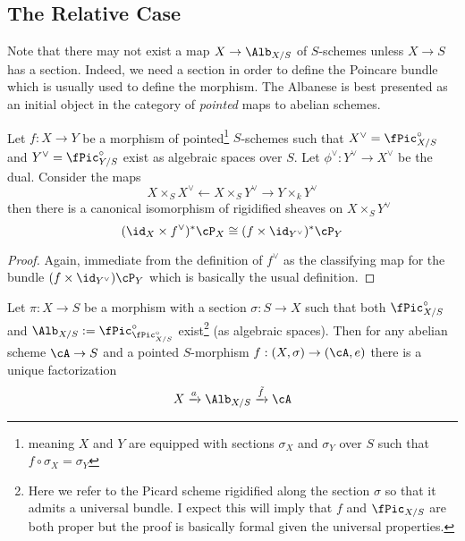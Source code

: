 \documentclass[12pt]{article}
\begin{document}
\subsection{The Relative Case}

\begin{rmk}
Note that there may not exist a map $X \to \Alb_{X/S}$ of $S$-schemes unless $X \to S$ has a section. Indeed, we need a section in order to define the Poincare bundle which is usually used to define the morphism. The Albanese is best presented as an initial object in the category of \textit{pointed} maps to abelian schemes.
\end{rmk}

\begin{lemma}
Let $f : X \to Y$ be a morphism of pointed\footnote{meaning $X$ and $Y$ are equipped with sections $\sigma_X$ and $\sigma_Y$ over $S$ such that $f \circ \sigma_X = \sigma_Y$} $S$-schemes such that $X^\vee = \fPic_{X/S}^\circ$ and $Y^\vee = \fPic_{Y/S}^\circ$ exist as algebraic spaces over $S$. Let $\phi^\vee : Y^\vee \to X^\vee$ be the dual. Consider the maps
\[ X \times_S X^\vee \leftarrow X \times_S Y^\vee \to Y \times_k Y^\vee \]
then there is a canonical isomorphism of rigidified sheaves on $X \times_S Y^\vee$
\[ (\id_X \times f^\vee)^* \cP_X \cong (f \times \id_{Y^\vee})^* \cP_Y \]
\end{lemma}

\begin{proof}
Again, immediate from the definition of $f^\vee$ as the classifying map for the bundle $(f \times \id_{Y^\vee}) \cP_Y$ which is basically the usual definition. 
\end{proof}

\begin{prop}
Let $\pi : X \to S$ be a morphism with a section $\sigma : S \to X$ such that both $\fPic_{X/S}^\circ$ and $\Alb_{X/S} := \fPic_{\fPic_{X/S}^\circ}^\circ$ exist\footnote{Here we refer to the Picard scheme rigidified along the section $\sigma$ so that it admits a universal bundle. I expect this will imply that $f$ and $\fPic_{X/S}$ are both proper but the proof is basically formal given the universal properties.} (as algebraic spaces). Then for any abelian scheme $\cA \to S$ and a pointed $S$-morphism $f : (X, \sigma) \to (\cA, e)$ there is a unique factorization 
\[ X \xrightarrow{a} \Alb_{X/S} \xrightarrow{\tilde{f}} \cA \]
\end{prop}
\end{document}
